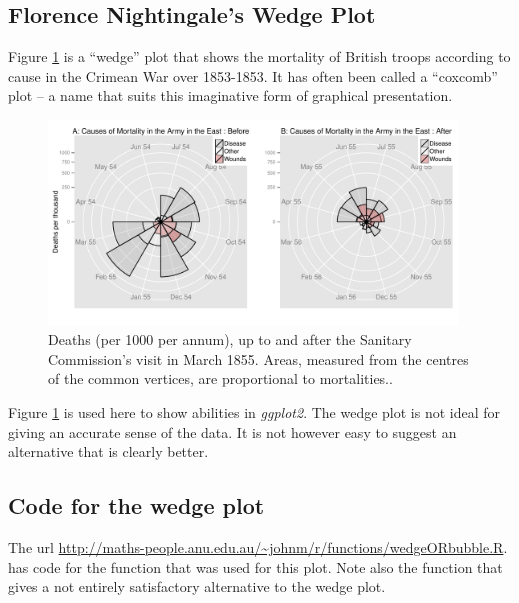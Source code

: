 \newpage
\subsection*{Florence Nightingale's Wedge Plot}\label{sec:wedge}


Figure \ref{col:wedgeplot} is a ``wedge'' plot that shows the
mortality of British troops according to cause in the Crimean War over
1853-1853. It has often been called a ``coxcomb'' plot -- a name that
suits this imaginative form of graphical presentation.

\begin{figure}
\centerline{\includegraphics[width=0.97\textwidth]{colorArt/allwedge}}%
\caption{Deaths (per 1000 per annum), up to and after the
  Sanitary Commission's visit in March 1855.  Areas, measured from the
centres of the common vertices, are proportional
  to mortalities..\label{col:wedgeplot}}
\end{figure}

Figure \ref{col:wedgeplot} is used here to show abilities in
\textit{ggplot2}.  The wedge plot is not ideal for giving an accurate
sense of the data.  It is not however easy to suggest an alternative
that is clearly better.

\subsection*{ Code for the wedge plot}

The url
\url{http://maths-people.anu.edu.au/~johnm/r/functions/wedgeORbubble.R}. has code for the function  that was
used for this plot.  Note also the function  that
gives a not entirely satisfactory alternative to the wedge plot.

